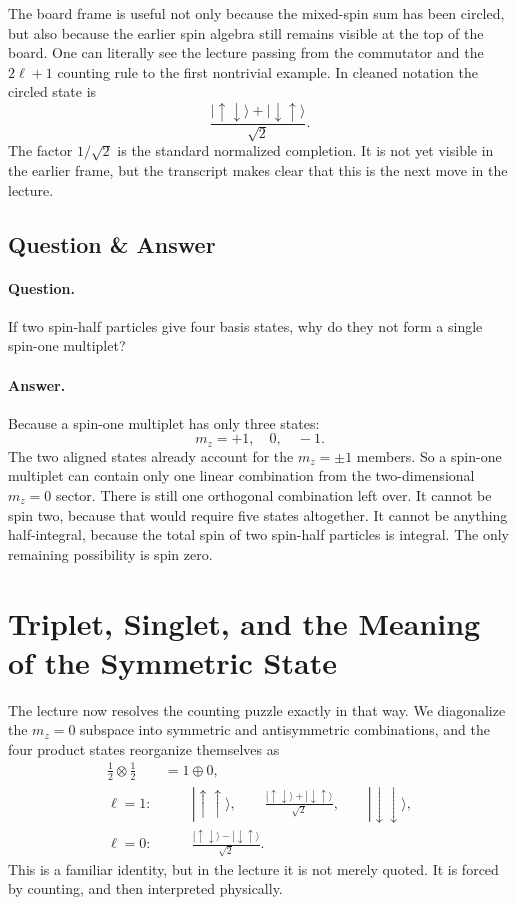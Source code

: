The board frame is useful not only because the mixed-spin sum has been circled, but also because the earlier spin algebra still remains visible at the top of the board. One can literally see the lecture passing from the commutator and the \(2\ell+1\) counting rule to the first nontrivial example. In cleaned notation the circled state is
\begin{equation}
\frac{|\uparrow\downarrow\rangle+|\downarrow\uparrow\rangle}{\sqrt2}.
\end{equation}
The factor \(1/\sqrt2\) is the standard normalized completion. It is not yet visible in the earlier frame, but the transcript makes clear that this is the next move in the lecture.

\subsection{Question \& Answer}

\paragraph{Question.} If two spin-half particles give four basis states, why do they not form a single spin-one multiplet?

\paragraph{Answer.} Because a spin-one multiplet has only three states:
\[
m_z=+1,\quad 0,\quad -1.
\]
The two aligned states already account for the \(m_z=\pm1\) members. So a spin-one multiplet can contain only one linear combination from the two-dimensional \(m_z=0\) sector. There is still one orthogonal combination left over. It cannot be spin two, because that would require five states altogether. It cannot be anything half-integral, because the total spin of two spin-half particles is integral. The only remaining possibility is spin zero.

\section{Triplet, Singlet, and the Meaning of the Symmetric State}

The lecture now resolves the counting puzzle exactly in that way. We diagonalize the \(m_z=0\) subspace into symmetric and antisymmetric combinations, and the four product states reorganize themselves as
\begin{align}
\frac12\otimes\frac12 &= 1\oplus 0, \\
\ell=1:&\qquad
|\uparrow\uparrow\rangle,\qquad
\frac{|\uparrow\downarrow\rangle+|\downarrow\uparrow\rangle}{\sqrt2},\qquad
|\downarrow\downarrow\rangle, \\
\ell=0:&\qquad
\frac{|\uparrow\downarrow\rangle-|\downarrow\uparrow\rangle}{\sqrt2}.
\end{align}
This is a familiar identity, but in the lecture it is not merely quoted. It is forced by counting, and then interpreted physically.

